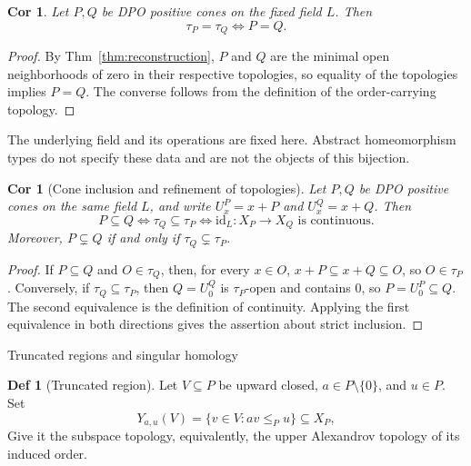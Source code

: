 \documentclass[10pt,letterpaper]{amsart}
\makeatletter
\numberwithin{equation}{section}
\newtheorem{cor}[thm]{Cor}
\theoremstyle{definition}
\newtheorem{defn}{Def}[section]
\newcommand{\id}{\mathrm{id}}
\def\subsection{\@startsection{subsection}{2}
  \z@{.9\linespacing\@plus.3\linespacing}{.4\linespacing}
  {\normalfont\fontsize{11.5}{14}\selectfont\bfseries\boldmath\raggedright}}
\makeatother
\begin{document}
\begin{cor}\label{cor:marked-field}
Let $P,Q$ be DPO positive cones on the fixed field $L$. Then
\[
\tau_P=\tau_Q\iff P=Q.
\]
\end{cor}
\begin{proof}
By Thm~\ref{thm:reconstruction}, $P$ and $Q$ are the minimal open neighborhoods of zero in their respective topologies, so equality of the topologies implies $P=Q$. The converse follows from the definition of the order-carrying topology.
\end{proof}

The underlying field and its operations are fixed here. Abstract homeomorphism types do not specify these data and are not the objects of this bijection.

\begin{cor}[Cone inclusion and refinement of topologies]\label{cor:cone-topology}
Let $P,Q$ be DPO positive cones on the same field $L$, and write $U_x^P=x+P$ and $U_x^Q=x+Q$. Then
\[
P\subseteq Q
\iff\tau_Q\subseteq\tau_P
\iff\id_L:X_P\longrightarrow X_Q\text{ is continuous}.
\]
Moreover, $P\subsetneq Q$ if and only if $\tau_Q\subsetneq\tau_P$.
\end{cor}
\begin{proof}
If $P\subseteq Q$ and $O\in\tau_Q$, then, for every $x\in O$,
$x+P\subseteq x+Q\subseteq O$, so $O\in\tau_P$.
Conversely, if $\tau_Q\subseteq\tau_P$, then $Q=U_0^Q$ is $\tau_P$-open and contains $0$, so $P=U_0^P\subseteq Q$.
The second equivalence is the definition of continuity. Applying the first equivalence in both directions gives the assertion about strict inclusion.
\end{proof}

\subsection{Truncated regions and singular homology}
\begin{defn}[Truncated region]\label{def:truncation}
Let $V\subseteq P$ be upward closed, $a\in P\setminus\{0\}$, and $u\in P$. Set
\[
Y_{a,u}(V)=\{v\in V:av\le_Pu\}\subseteq X_P,
\]
Give it the subspace topology, equivalently, the upper Alexandrov topology of its induced order.
\end{defn}
\end{document}
